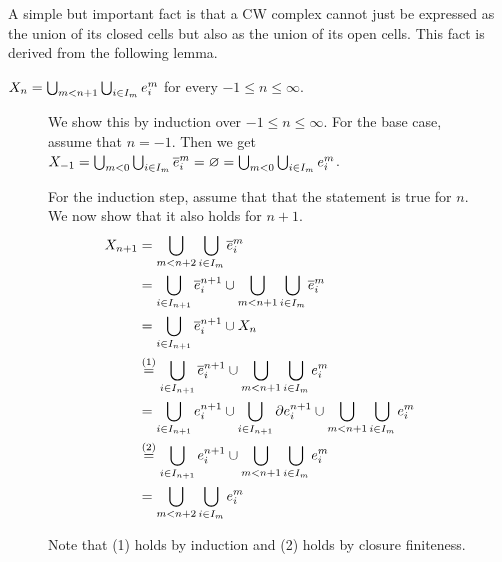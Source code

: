 A simple but important fact is that a CW complex cannot just be expressed as the union of its closed cells but also as the union of its open cells. This fact is derived from the following lemma. 

\begin{lemma}\label{hannah:scholz:lem:1}
    $X_n = \bigcup_{m < n + 1}\bigcup_{i \in I_m} \openCell{m}{i}$ for every $-1 \le n \le \infty$.
\end{lemma}

\begin{figure}
    \centering
    \begin{framed}
    \begin{minipage}[t]{0.4\linewidth}
            \tiny
We show this by induction over $-1 \le n \le \infty$.
    For the base case, assume that $n = -1$.
    Then we get $X_{-1} = \bigcup_{m < 0}\bigcup_{i \in I_m}\closedCell{m}{i} = \varnothing = \bigcup_{m < 0}\bigcup_{i \in I_m} \openCell{m}{i}$.

    For the induction step, assume that that the statement is true for $n$.
    We now show that it also holds for $n + 1$.
    \begin{equation*}
        \begin{split}
            X_{n + 1} &= \bigcup_{m < n + 2}\bigcup_{i \in I_m} \closedCell{m}{i} \\
            &=\bigcup_{i \in I_{n + 1}}\closedCell{n+1}{i} \cup \bigcup_{m < n + 1}\bigcup_{i \in I_m} \closedCell{m}{i} \\
            &= \bigcup_{i \in I_{n + 1}}\closedCell{n+1}{i} \cup X_n \\
            &\stackrel{(1)}{=} \bigcup_{i \in I_{n + 1}}\closedCell{n+1}{i} \cup \bigcup_{m < n + 1}\bigcup_{i \in I_m} \openCell{m}{i} \\
            &= \bigcup_{i \in I_{n + 1}}\openCell{n+1}{i} \cup \bigcup_{i \in I_{n + 1}}\cellFrontier{n+1}{i} \cup \bigcup_{m < n + 1}\bigcup_{i \in I_m} \openCell{m}{i} \\
            &\stackrel{(2)}{=} \bigcup_{i \in I_{n + 1}}\openCell{n+1}{i} \cup \bigcup_{m < n + 1}\bigcup_{i \in I_m} \openCell{m}{i} \\
            &= \bigcup_{m < n + 2}\bigcup_{i \in I_m} \openCell{m}{i}
        \end{split}
    \end{equation*}
        \end{minipage}
        \hspace{0.5cm}
        \begin{minipage}[t]{0.4\linewidth}
            \tiny
Note that (1) holds by induction and (2) holds by closure finiteness.


\end{minipage}
\end{framed}
\end{figure}
